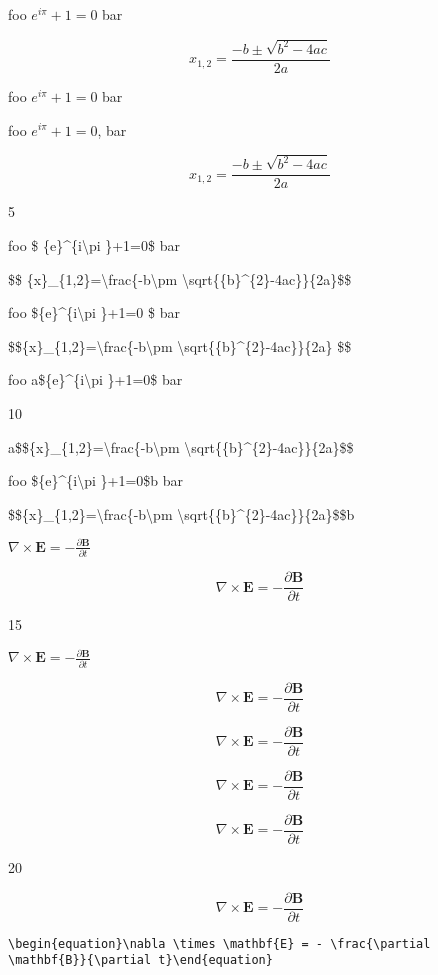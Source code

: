 
\def\mytitle{Math}


foo \({e}^{i\pi }+1=0\) bar

\[ {x}_{1,2}=\frac{-b\pm \sqrt{{b}^{2}-4ac}}{2a} \]

foo ${e}^{i\pi }+1=0$ bar

foo ${e}^{i\pi }+1=0$, bar

$${x}_{1,2}=\frac{-b\pm \sqrt{{b}^{2}-4ac}}{2a}$$

5

foo \$ \{e\}\^{}\{i\textbackslash{}pi \}+1=0\$ bar

\$\$ \{x\}\_\{1,2\}=\textbackslash{}frac\{-b\textbackslash{}pm \textbackslash{}sqrt\{\{b\}\^{}\{2\}-4ac\}\}\{2a\}\$\$

foo \$\{e\}\^{}\{i\textbackslash{}pi \}+1=0 \$ bar

\$\$\{x\}\_\{1,2\}=\textbackslash{}frac\{-b\textbackslash{}pm \textbackslash{}sqrt\{\{b\}\^{}\{2\}-4ac\}\}\{2a\} \$\$

foo a\$\{e\}\^{}\{i\textbackslash{}pi \}+1=0\$ bar

10

a\$\$\{x\}\_\{1,2\}=\textbackslash{}frac\{-b\textbackslash{}pm \textbackslash{}sqrt\{\{b\}\^{}\{2\}-4ac\}\}\{2a\}\$\$

foo \$\{e\}\^{}\{i\textbackslash{}pi \}+1=0\$b bar

\$\$\{x\}\_\{1,2\}=\textbackslash{}frac\{-b\textbackslash{}pm \textbackslash{}sqrt\{\{b\}\^{}\{2\}-4ac\}\}\{2a\}\$\$b

$\nabla \times \mathbf{E} = - \frac{\partial \mathbf{B}}{\partial t}$

$$\nabla \times \mathbf{E} = - \frac{\partial \mathbf{B}}{\partial t}$$

15

\(\nabla \times \mathbf{E} = - \frac{\partial \mathbf{B}}{\partial t}\)

\[\nabla \times \mathbf{E} = - \frac{\partial \mathbf{B}}{\partial t}\]

\begin{equation}\nabla \times \mathbf{E} = - \frac{\partial \mathbf{B}}{\partial t}\end{equation}

\begin{equation}\nabla \times \mathbf{E} = - \frac{\partial \mathbf{B}}{\partial t}\end{equation}

\begin{equation}\nabla \times \mathbf{E} = - \frac{\partial \mathbf{B}}{\partial t}\end{equation}

20

\begin{equation}\nabla \times \mathbf{E} = - \frac{\partial \mathbf{B}}{\partial t}\end{equation}

\texttt{\textbackslash{}begin\{equation\}\textbackslash{}nabla \textbackslash{}times \textbackslash{}mathbf\{E\} = - \textbackslash{}frac\{\textbackslash{}partial \textbackslash{}mathbf\{B\}\}\{\textbackslash{}partial t\}\textbackslash{}end\{equation\}}



